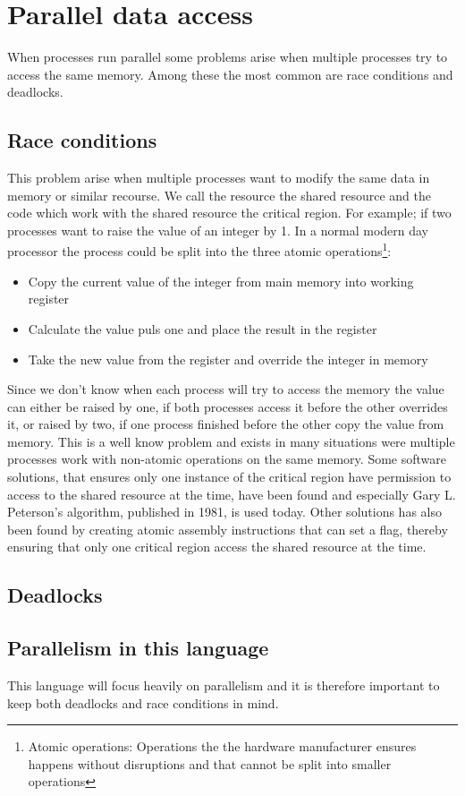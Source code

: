 \section{Parallel data access}
When processes run parallel some problems arise when multiple processes try to access the same memory. Among these the most common are race conditions and deadlocks.

\subsection{Race conditions}
This problem arise when multiple processes want to modify the same data in memory or similar recourse. We call the resource the shared resource and the code which work with the shared resource the critical region. For example; if two processes want to raise the value of an integer by 1. In a normal modern day processor the process could be split into the three atomic operations\footnote{Atomic operations: Operations the the hardware manufacturer ensures happens without disruptions and that cannot be split into smaller operations}:
\begin{itemize}
\item Copy the current value of the integer from main memory into working register
\item Calculate the value puls one and place the result in the register
\item Take the new value from the register and override the integer in memory
\end{itemize}
Since we don't know when each process will try to access the memory the value can either be raised by one, if both processes access it before the other overrides it, or raised by two, if one process finished before the other copy the value from memory. This is a well know problem and exists in many situations were multiple processes work with non-atomic operations on the same memory. Some software solutions, that ensures only one instance of the critical region have permission to access to the shared resource at the time, have been found and especially Gary L. Peterson's algorithm, published in 1981, is used today. Other solutions has also been found by creating atomic assembly instructions that can set a flag, thereby ensuring that only one critical region access the shared resource at the time.

\subsection{Deadlocks}

\subsection{Parallelism in this language}
This language will focus heavily on parallelism and it is therefore important to keep both deadlocks and race conditions in mind. 